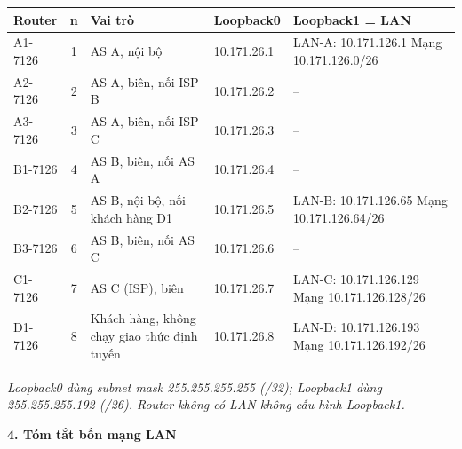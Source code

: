 \begin{table}[H]
\centering
\footnotesize
\renewcommand{\arraystretch}{1.65}
\setlength{\tabcolsep}{4pt}

\begin{tabularx}{\textwidth}{
|l|c|>{\raggedright\arraybackslash}X|l|
>{\raggedright\arraybackslash}p{4.1cm}|
}
\hline

\textbf{Router} &
\textbf{n} &
\textbf{Vai trò} &
\textbf{Loopback0} &
\textbf{Loopback1 = LAN} \\
\hline

A1-7126 & 1 &
AS A, nội bộ &
10.171.26.1 &
LAN-A: 10.171.126.1
\newline Mạng 10.171.126.0/26 \\
\hline

A2-7126 & 2 &
AS A, biên, nối ISP B &
10.171.26.2 &
-- \\
\hline

A3-7126 & 3 &
AS A, biên, nối ISP C &
10.171.26.3 &
-- \\
\hline

B1-7126 & 4 &
AS B, biên, nối AS A &
10.171.26.4 &
-- \\
\hline

B2-7126 & 5 &
AS B, nội bộ, nối khách hàng D1 &
10.171.26.5 &
LAN-B: 10.171.126.65
\newline Mạng 10.171.126.64/26 \\
\hline

B3-7126 & 6 &
AS B, biên, nối AS C &
10.171.26.6 &
-- \\
\hline

C1-7126 & 7 &
AS C (ISP), biên &
10.171.26.7 &
LAN-C: 10.171.126.129
\newline Mạng 10.171.126.128/26 \\
\hline

D1-7126 & 8 &
Khách hàng, không chạy giao thức định tuyến &
10.171.26.8 &
LAN-D: 10.171.126.193
\newline Mạng 10.171.126.192/26 \\
\hline

\end{tabularx}
\end{table}

{\footnotesize
\textit{
Loopback0 dùng subnet mask
255.255.255.255 (/32);
Loopback1 dùng 255.255.255.192 (/26).
Router không có LAN không cấu hình Loopback1.
}
}

\vspace{0.4cm}

{\bfseries\large
4. Tóm tắt bốn mạng LAN
}

